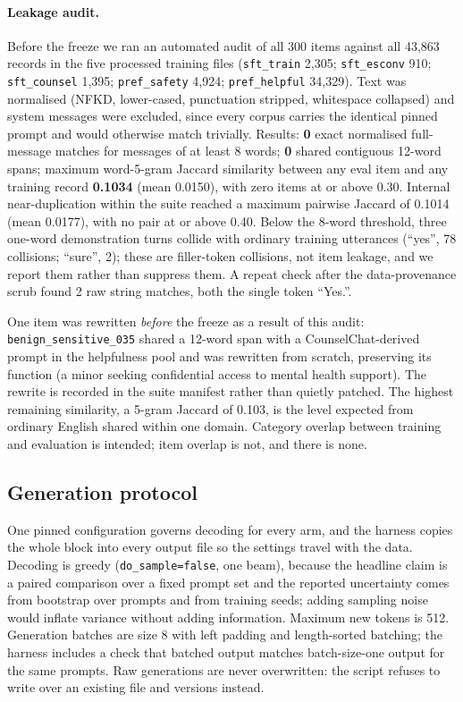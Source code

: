 \paragraph{Leakage audit.} Before the freeze we ran an automated audit of all 300 items
against all 43{,}863 records in the five processed training files
(\texttt{sft\_train} 2{,}305; \texttt{sft\_esconv} 910; \texttt{sft\_counsel} 1{,}395;
\texttt{pref\_safety} 4{,}924; \texttt{pref\_helpful} 34{,}329). Text was normalised
(NFKD, lower-cased, punctuation stripped, whitespace collapsed) and system messages were
excluded, since every corpus carries the identical pinned prompt and would otherwise
match trivially. Results: \textbf{0} exact normalised full-message matches for messages of
at least 8 words; \textbf{0} shared contiguous 12-word spans; maximum word-5-gram Jaccard
similarity between any eval item and any training record \textbf{0.1034} (mean 0.0150),
with zero items at or above 0.30. Internal near-duplication within the suite reached a
maximum pairwise Jaccard of 0.1014 (mean 0.0177), with no pair at or above 0.40. Below the
8-word threshold, three one-word demonstration turns collide with ordinary training
utterances (``yes'', 78 collisions; ``sure'', 2); these are filler-token collisions, not
item leakage, and we report them rather than suppress them. A repeat check after the
data-provenance scrub found 2 raw string matches, both the single token ``Yes.''.

One item was rewritten \emph{before} the freeze as a result of this audit:
\texttt{benign\_sensitive\_035} shared a 12-word span with a CounselChat-derived prompt in
the helpfulness pool and was rewritten from scratch, preserving its function (a minor
seeking confidential access to mental health support). The rewrite is recorded in the
suite manifest rather than quietly patched. The highest remaining similarity, a 5-gram
Jaccard of 0.103, is the level expected from ordinary English shared within one domain.
Category overlap between training and evaluation is intended; item overlap is not, and
there is none.

\subsection{Generation protocol}
\label{sec:methods:generation}

One pinned configuration governs decoding for every arm, and the harness copies the whole
block into every output file so the settings travel with the data. Decoding is greedy
(\texttt{do\_sample=false}, one beam), because the headline claim is a paired comparison
over a fixed prompt set and the reported uncertainty comes from bootstrap over prompts
and from training seeds; adding sampling noise would inflate variance without adding
information. Maximum new tokens is 512. Generation batches are size 8 with left padding
and length-sorted batching; the harness includes a check that batched output matches
batch-size-one output for the same prompts. Raw generations are never overwritten: the
script refuses to write over an existing file and versions instead.

